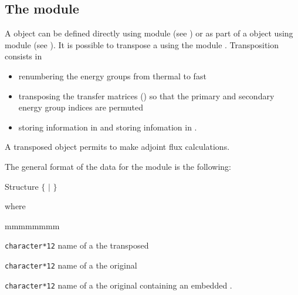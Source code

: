\subsection{The  module}\label{sect:TData}

A   object can be defined directly using module  (see )
or as part of a  object using module  (see ). It is possible to
transpose a   using the module . Transposition consists in
\begin{itemize}
\item renumbering the energy groups from thermal to fast
\item transposing the transfer matrices () so that the primary and secondary energy group indices are permuted
\item storing  information in  and storing  infomation in .
\end{itemize}

A transposed   object permits to make adjoint flux calculations.

\vskip 0.08cm

The general format of the data for the  module is the following:

\begin{DataStructure}{Structure } 
 \moc{:=}  $\{$  $|$  $\}$ \moc{;}
\end{DataStructure}

\noindent where
\begin{ListeDeDescription}{mmmmmmmm}

\item[\dusa{MACLIB1}] {\tt character*12} name of a the transposed 

\item[\dusa{MACLIB2}] {\tt character*12} name of a the original 

\item[\dusa{LIBRARY}] {\tt character*12} name of a the original  containing an embedded .

\end{ListeDeDescription}
\eject
